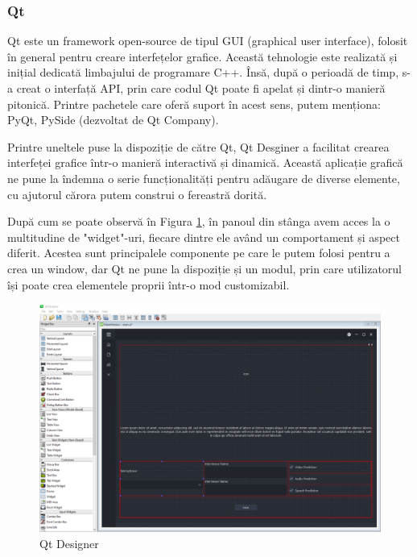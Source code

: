 \documentclass[a4paper, 12pt]{report}
\begin{document}
	\subsubsection{Qt}
 	Qt \cite{qt} este un framework open-source de tipul GUI (graphical user interface), folosit în general pentru creare interfețelor grafice. Această tehnologie este realizată și inițial dedicată limbajului de programare C++. Însă, după o perioadă de timp, s-a creat o interfață API, prin care codul Qt poate fi apelat și dintr-o manieră pitonică. Printre pachetele care oferă suport în acest sens, putem menționa: PyQt, PySide (dezvoltat de Qt Company). 
 
 	Printre uneltele puse la dispoziție de către Qt, Qt Desginer a facilitat crearea interfeței grafice într-o manieră interactivă și 	 dinamică. Această aplicație grafică ne pune la îndemna o serie funcționalități pentru adăugare de diverse elemente, cu ajutorul cărora putem construi o fereastră dorită. 
 	
 	După cum se poate observă în Figura \ref{fig:qt_designer}, în panoul din stânga avem acces la o multitudine de "widget"-uri, fiecare dintre ele având un comportament și aspect diferit. Acestea sunt principalele componente pe care le putem folosi pentru a crea un window, dar Qt ne pune la dispoziție și un modul, prin care utilizatorul își poate crea elementele proprii într-o mod customizabil.
	
	\begin{figure}[H]
		\begin{center}
			\includegraphics[scale=0.4]{images/qt_designer.png}
		\end{center}
		\caption{Qt Designer}
		\label{fig:qt_designer}
	\end{figure} 
\end{document}
